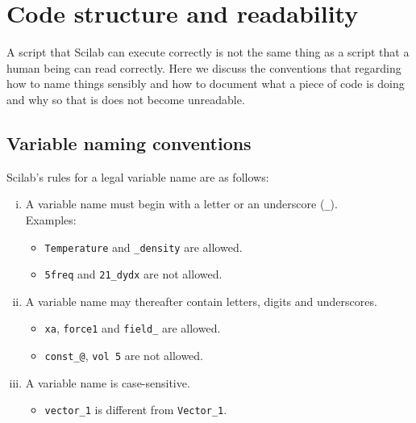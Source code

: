 \section{Code structure and readability}
	A script that Scilab can execute correctly is not the same thing as a script that a human being can read correctly. Here we discuss the conventions that regarding how to name things sensibly and how to document what a piece of code is doing and why so that is does not become unreadable.

	\subsection{Variable naming conventions}
		Scilab's rules for a legal variable name are as follows:
		\begin{enumerate}[i.]
			\item A variable name must begin with a letter or an underscore (\verb|_|).\\
			Examples:
			\begin{itemize}
				\item \verb|Temperature| and \verb|_density| are allowed.
				\item \verb|5freq| and \verb|21_dydx| are not allowed.
			\end{itemize}
			
			\item A variable name may thereafter contain letters, digits and underscores.
			\begin{itemize}
				\item \verb|xa|, \verb|force1| and \verb|field_| are allowed.
				\item \verb|const_@|, \verb|vol 5| are not allowed.
			\end{itemize}
			
			\item A variable name is case-sensitive.
			\begin{itemize}
				\item \verb|vector_1| is different from \verb|Vector_1|.
			\end{itemize}
		\end{enumerate}
		
